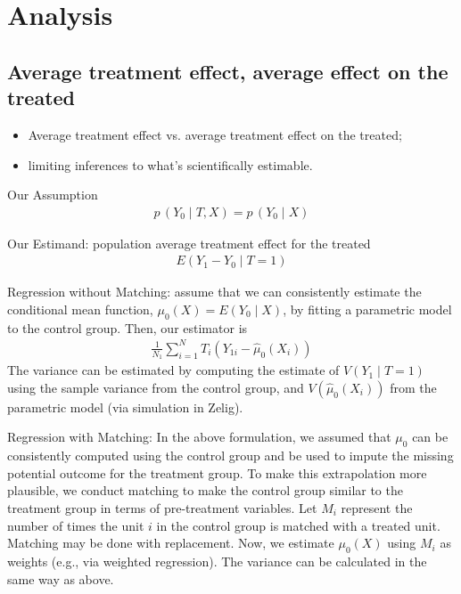 \documentclass[11pt,titlepage]{article}
\begin{document}
\section{Analysis}
\label{analysis}
\subsection{Average treatment effect, average effect on the treated}

\begin{itemize} 
\item Average treatment effect vs. average treatment effect on the
  treated;
\item limiting inferences to what's scientifically estimable.
\end{itemize}

Our Assumption
\begin{eqnarray}
  p\,(Y_0 \mid T,  X) = p\,(Y_0 \mid X)
\end{eqnarray}

Our Estimand: population average treatment effect for the treated
\begin{eqnarray}
  E(Y_1 - Y_0 \mid T=1)
\end{eqnarray}

Regression without Matching: assume that we can consistently estimate
the conditional mean function, $\mu_{0}(X)= E(Y_0 \mid X)$, by fitting
a parametric model to the control group.  Then, our estimator is
\begin{eqnarray}
    \frac{1}{N_1} \sum_{i=1}^{N} T_i (Y_{1i} - \hat{\mu}_0(X_i))
\end{eqnarray}
The variance can be estimated by computing the estimate of $V(Y_1 \mid
T=1)$ using the sample variance from the control group, and
$V(\hat{\mu}_0(X_i))$ from the parametric model (via simulation in
Zelig).

Regression with Matching: In the above formulation, we assumed that
$\mu_{0}$ can be consistently computed using the control group and be
used to impute the missing potential outcome for the treatment group.
To make this extrapolation more plausible, we conduct matching to make
the control group similar to the treatment group in terms of
pre-treatment variables. Let $M_i$ represent the number of times the
unit $i$ in the control group is matched with a treated unit.
Matching may be done with replacement.  Now, we estimate $\mu_{0}(X)$
using $M_i$ as weights (e.g., via weighted regression). The variance
can be calculated in the same way as above.
\end{document}
